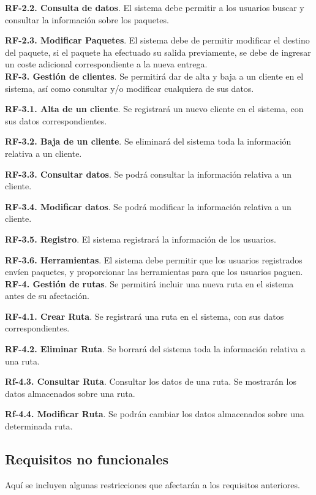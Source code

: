 \documentclass[a4paper, 11pt]{article}
\begin{document}
\textbf{RF-2.2. Consulta de datos}. El sistema debe permitir a los usuarios buscar y consultar la  informaci\'on sobre los paquetes. 

\textbf{RF-2.3. Modificar Paquetes}. El sistema debe de permitir modificar el destino del paquete, si el paquete ha efectuado su salida previamente, se debe de ingresar un coste adicional 	correspondiente a la nueva entrega.\\

\setlength{\parindent}{20pt}
\textbf{RF-3. Gesti\'on de clientes}. Se permitir\'a dar de alta y baja a un cliente en el sistema, as\'i como consultar y/o modificar cualquiera de sus datos.

\setlength{\parindent}{35pt}
\textbf{RF-3.1. Alta de un cliente}. Se registrar\'a un nuevo cliente en el sistema, con sus datos correspondientes.

\textbf{RF-3.2. Baja de un cliente}. Se eliminar\'a del sistema toda la informaci\'on relativa a un cliente.

\textbf{RF-3.3. Consultar datos}. Se podr\'a consultar la informaci\'on relativa a un cliente.

\textbf{RF-3.4. Modificar datos}. Se podr\'a modificar la informaci\'on relativa a un cliente.

\textbf{RF-3.5. Registro}. El sistema registrar\'a la informaci\'on de los usuarios.

\textbf{RF-3.6. Herramientas}. El sistema debe permitir que los usuarios registrados env\'ien paquetes, 	y proporcionar las herramientas para que los usuarios paguen.\\

\setlength{\parindent}{20pt}
\textbf{RF-4. Gesti\'on de rutas}. Se permitir\'a incluir una nueva ruta en el sistema antes de su afectaci\'on.

\setlength{\parindent}{35pt}
\textbf{RF-4.1. Crear Ruta}. Se registrar\'a una ruta en el sistema, con sus datos correspondientes.

\textbf{RF-4.2. Eliminar Ruta}. Se borrar\'a del sistema toda la informaci\'on relativa a una ruta.

\textbf{Rf-4.3. Consultar Ruta}. Consultar los datos de una ruta. Se mostrar\'an  los datos almacenados sobre una ruta.

\textbf{Rf-4.4. Modificar Ruta}. Se podr\'an cambiar los datos almacenados sobre una determinada 	ruta.

\setlength{\parindent}{12pt}
\subsection{Requisitos no funcionales}
Aqu\'i se incluyen algunas restricciones que afectar\'an a los requisitos anteriores.
\end{document}
